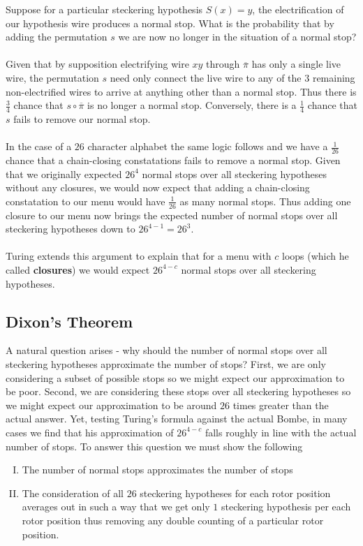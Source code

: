 \noindent Suppose for a particular steckering hypothesis $S(x) = y$, the electrification of our hypothesis wire produces a normal stop. What is the probability that by adding the permutation $s$ we are now no longer in the situation of a normal stop?
\\\\Given that by supposition electrifying wire $xy$ through $\overline\pi$ has only a single live wire, the permutation $s$ need only connect the live wire to any of the $3$ remaining non-electrified wires to arrive at anything other than a normal stop. Thus there is $\frac{3}{4}$ chance that $s\circ\overline\pi$ is no longer a normal stop. Conversely, there is a $\frac{1}{4}$ chance that $s$ fails to remove our normal stop.
\\\\In the case of a $26$ character alphabet the same logic follows and we have a $\frac{1}{26}$ chance that a chain-closing constatations fails to remove a normal stop. Given that we originally expected $26^4$ normal stops over all steckering hypotheses without any closures, we would now expect that adding a chain-closing constatation to our menu would have $\frac{1}{26}$ as many normal stops. Thus adding one closure to our menu now brings the expected number of normal stops over all steckering hypotheses down to $26^{4-1} = 26^3$.
\\\\Turing extends this argument to explain that for a menu with $c$ loops (which he called {\bf{closures}}) we would expect $26^{4-c}$ normal stops over all steckering hypotheses.
\subsection{Dixon's Theorem}
A natural question arises - why should the number of normal stops over all steckering hypotheses approximate the number of stops? First, we are only considering a subset of possible stops so we might expect our approximation to be poor. Second, we are considering these stops over all steckering hypotheses so we might expect our approximation to be around $26$ times greater than the actual answer. Yet, testing Turing's formula against the actual Bombe, in many cases we find that his approximation of $26^{4-c}$ falls roughly in line with the actual number of stops. To answer this question we must show the following
\begin{enumerate}[(I)]
	\item The number of normal stops approximates the number of stops
	\item The consideration of all $26$ steckering hypotheses for each rotor position averages out in such a way that we get only $1$ steckering hypothesis per each rotor position thus removing any double counting of a particular rotor position.
\end{enumerate}
